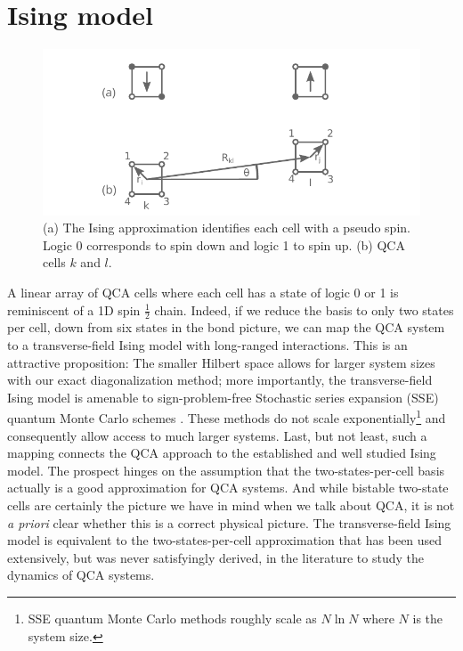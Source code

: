 \section{Ising model}

%
\begin{figure}
  \center
  \includegraphics{ising}
  \caption{
  (a) The Ising approximation identifies each cell with a pseudo spin. Logic 0
  corresponds to spin down and logic 1 to spin up. (b) QCA cells $k$ and $l$. 
  }
  \label{fig:ising}
\end{figure}
%
A linear array of QCA cells where each cell has a state of logic 0 or 1 is
reminiscent of a 1D spin $\frac{1}{2}$ chain. Indeed, if we reduce the basis to
only two states per cell, down from six states in the bond picture, we can map
the QCA system to a transverse-field Ising model with long-ranged interactions.
This is an attractive proposition: The smaller Hilbert space allows for larger
system sizes with our exact diagonalization method; more importantly, the
transverse-field Ising model is amenable to sign-problem-free Stochastic series
expansion (SSE) quantum Monte Carlo schemes \cite{Sandvik2003}. These methods do
not scale exponentially\footnote{SSE quantum Monte Carlo methods roughly scale
as $N \ln N$ where $N$ is the system size.} and consequently allow access to
much larger systems. Last, but not least, such a mapping connects the QCA
approach to the established and well studied Ising model. The prospect hinges on
the assumption that the two-states-per-cell basis actually is a good
approximation for QCA systems. And while bistable two-state cells are certainly
the picture we have in mind when we talk about QCA, it is not \emph{a priori}
clear whether this is a correct physical picture. The transverse-field Ising
model is equivalent to the two-states-per-cell approximation that has been used
extensively, but was never satisfyingly derived, in the literature to study the
dynamics of QCA systems.

